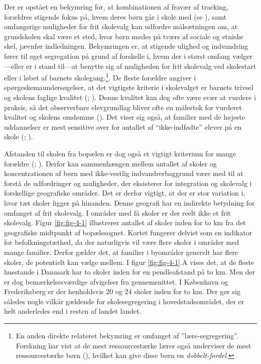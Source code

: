 \documentclass[
]{book}
\begin{document}
Der er opstået en bekymring for, at kombinationen af fravær af tracking, forældres stigende fokus på, hvem deres børn går i skole med (se ), samt omfangsrige muligheder for frit skolevalg kan udfordre målsætningen om, at grundskolen skal være et sted, hvor børn mødes på tværs af sociale og etniske skel, jævnfør indledningen. Bekymringen er, at stigende ulighed og indvandring fører til øget segregation på grund af forskelle i, hvem der i størst omfang vælger---eller er i stand til---at benytte sig af muligheden for frit skolevalg ved skolestart eller i løbet af barnets skolegang.\footnote{En anden direkte relateret bekymring er omfanget af ''lære-segregering''. Forskning har vist at de mest ressourcestærke lærer også underviser de mest ressourcestærke børn (), hvilket kan give disse børn en \emph{dobbelt-fordel}.}. De fleste forældre angiver i spørgeskemaundersøgelser, at det vigtigste kriterie i skolevalget er barnets trivsel og skolens faglige kvalitet (; ). Denne kvalitet kan dog ofte være svær at vurdere i praksis, så det observerbare elevgrundlag bliver ofte en målestok for vurderet kvalitet og skolens omdømme (). Det viser sig også, at familier med de højeste uddannelser er mest sensitive over for antallet af ``ikke-indfødte'' elever på en skole (; ).

Afstanden til skolen fra bopælen er dog også et vigtigt kriterium for mange forældre (; ). Derfor kan sammenhængen mellem antallet af skoler og koncentrationen af børn med ikke-vestlig indvandrerbaggrund være med til at forstå de udfordringer og muligheder, der eksisterer for integration og skolevalg i forskellige geografiske områder. Det er derfor vigtigt, at der er stor variation i, hvor tæt skoler ligger på hinanden. Denne geografi har en indirekte betydning for omfanget af frit skolevalg. I områder med få skoler er der reelt ikke et frit skolevalg. Figur \ref{fig:fig-4-1} illustrerer antallet af skoler inden for to km fra det geografiske midtpunkt af bopælssognet. Kortet fungerer delvist som en indikator for befolkningstæthed, da der naturligvis vil være flere skoler i områder med mange familier. Derfor gælder det, at familier i byområder generelt har flere skoler, de potentielt kan vælge mellem. I figur \ref{fig:fig-4-1}.A vises det, at de fleste husstande i Danmark har to skoler inden for en pendleafstand på to km. Men der er dog bemærkelsesværdige afvigelser fra gennemsnittet. I København og Frederiksberg er der henholdsvis 20 og 24 skoler inden for to km. Der gør sig således nogle vilkår gældende for skolesegregering i hovedstadsområdet, der er helt anderledes end i resten af landet landet.
\end{document}
